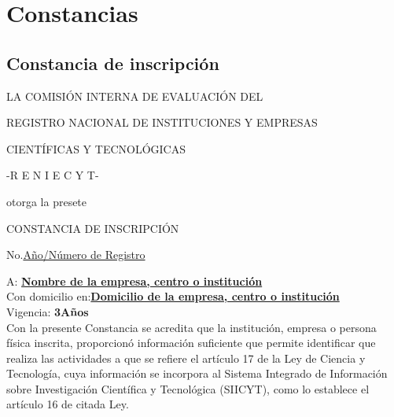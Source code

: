 \chapter{Constancias}
\label{appendix:Constancias}

\newpage
\section{Constancia de inscripción}
\label{appendix:Constancias:ConstanciaAceptada}
{\bf
\begin {center}LA COMISIÓN INTERNA DE EVALUACIÓN DEL\end{center}
\begin {center}REGISTRO NACIONAL DE INSTITUCIONES Y EMPRESAS \end{center}
\begin {center} CIENTÍFICAS Y TECNOLÓGICAS \end{center}
\begin {center} -R E N I E C Y T- \end{center}}
\begin {center}otorga la presete\\ \end{center}
{\bf \begin {center}CONSTANCIA DE INSCRIPCIÓN\\ \end{center}
\begin {center} No.\underline{Año/Número de Registro}\\ \end{center}}


\noindent A: {\bf \underline{Nombre de la empresa, centro o institución}}\\
Con domicilio en:{\bf \underline{Domicilio de la empresa, centro o institución}}\\
Vigencia: {\bf 3Años}\\

\noindent Con la presente Constancia se  acredita que la institución, empresa o persona física inscrita, proporcionó información suficiente que permite identificar que realiza las actividades a que se refiere el artículo 17 de la Ley de Ciencia y Tecnología, cuya información se incorpora al Sistema Integrado de Información sobre Investigación Científica y Tecnológica (SIICYT), como lo establece el artículo 16 de citada Ley.\\

